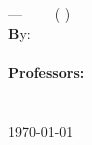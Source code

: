 %
%

\thispagestyle{empty}


\noindent
\begin{minipage}[t]{6cm}%
{\footnotesize%
\raisebox{-\height}{{\bfseries \University}} \\
\Location}
\end{minipage}%
\hfill%
\begin{minipage}[b]{10cm}%
\hfill{}
\end{minipage}

\ \\[2em]
\phantom{x} \hfill\parbox[t]{50 mm}{\bfseries \School\\[.5em]
\hfill\mdseries \College}\\[6 em]
\hfill

\noindent
\parbox{140mm}{\sffamily \bfseries \huge %
\Title%
}\\[.75 em]
{--- \CourseCode~\textbar~\CourseName~\textbar~(\Semester{} \Year)}\\[3 em]


\noindent
{\footnotesize \textbf By:}\\
\AuthorName\\[2em]


\noindent
{\footnotesize \bfseries Professor\ifTwoProfs{}s\fi:}\\
{\footnotesize \FirstProf%
\ifTwoProfs\\\SecondProf\fi}\\[2 em]
\vfill
{\footnotesize \monthyeardate\today}

\restoregeometry